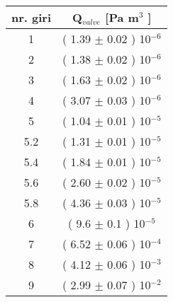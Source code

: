 \begin{center}
	\begin{tabular}{ c | c }
   nr. giri & Q$_{valve}$ [Pa m$^{3}$ ] \\%
	\hline
   1 & ( 1.39 $\pm$ 0.02 ) 10$^{-6}$ \\
   2 & ( 1.38 $\pm$ 0.02 ) 10$^{-6}$ \\
   3 & ( 1.63 $\pm$ 0.02 ) 10$^{-6}$ \\
   4 & ( 3.07 $\pm$ 0.03 ) 10$^{-6}$ \\
   5 & ( 1.04 $\pm$ 0.01 ) 10$^{-5}$ \\
   5.2 & ( 1.31 $\pm$ 0.01 ) 10$^{-5}$ \\
   5.4 & ( 1.84 $\pm$ 0.01 ) 10$^{-5}$ \\
   5.6 & ( 2.60 $\pm$ 0.02 ) 10$^{-5}$ \\
   5.8 & ( 4.36 $\pm$ 0.03 ) 10$^{-5}$ \\
   6 & ( 9.6 $\pm$ 0.1 ) 10$^{-5}$ \\
   7 & ( 6.52 $\pm$ 0.06 ) 10$^{-4}$ \\
   8 & ( 4.12 $\pm$ 0.06 ) 10$^{-3}$ \\
   9 & ( 2.99 $\pm$ 0.07 ) 10$^{-2}$ \\

	\end{tabular}
    \label{tab:table}
\end{center}